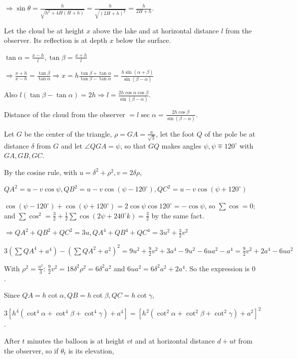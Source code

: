   $\Rightarrow \sin\theta = \frac{h}{\sqrt{h^2 + 4H(H + h)}} = \frac{h}{\sqrt{(2H + h)^2}} = \frac{h}{2H + h}$.
\item Let the cloud be at height $x$ above the lake and at horizontal distance $l$ from the observer. Its
  reflection is at depth $x$ below the surface.

  $\tan\alpha = \frac{x - h}{l}, \tan\beta = \frac{x + h}{l}$

  $\Rightarrow \frac{x + h}{x - h} = \frac{\tan\beta}{\tan\alpha}\Rightarrow x = h\frac{\tan\beta +
  \tan\alpha}{\tan\beta - \tan\alpha} = \frac{h\sin(\alpha + \beta)}{\sin(\beta - \alpha)}$

  Also $l(\tan\beta - \tan\alpha) = 2h\Rightarrow l = \frac{2h\cos\alpha\cos\beta}{\sin(\beta - \alpha)}$.

  Distance of the cloud from the observer $= l\sec\alpha = \frac{2h\cos\beta}{\sin(\beta - \alpha)}$.
\item Let $G$ be the center of the triangle, $\rho = GA = \frac{a}{\sqrt{3}}$, let the foot $Q$ of the pole be
  at distance $\delta$ from $G$ and let $\angle QGA = \psi$, so that $GQ$ makes angles $\psi, \psi\mp120^\circ$
  with $GA, GB, GC$.

  By the cosine rule, with $u = \delta^2 + \rho^2, v = 2\delta\rho$,

  $QA^2 = u - v\cos\psi, QB^2 = u - v\cos(\psi - 120^\circ), QC^2 = u - v\cos(\psi + 120^\circ)$

  $\cos(\psi - 120^\circ) + \cos(\psi + 120^\circ) = 2\cos\psi\cos120^\circ = -\cos\psi$, so $\sum\cos = 0$; and
  $\sum\cos^2 = \frac{3}{2} + \frac{1}{2}\sum\cos(2\psi + 240^\circ k) = \frac{3}{2}$ by the same fact.

  $\Rightarrow QA^2 + QB^2 + QC^2 = 3u, QA^4 + QB^4 + QC^4 = 3u^2 + \frac{3}{2}v^2$

  $3\left(\sum QA^4 + a^4\right) - \left(\sum QA^2 + a^2\right)^2 = 9u^2 + \frac{9}{2}v^2 + 3a^4 - 9u^2 - 6ua^2 -
  a^4 = \frac{9}{2}v^2 + 2a^4 - 6ua^2$

  With $\rho^2 = \frac{a^2}{3}$: $\frac{9}{2}v^2 = 18\delta^2\rho^2 = 6\delta^2a^2$ and $6ua^2 = 6\delta^2a^2 +
  2a^4$. So the expression is $0$.

  Since $QA = h\cot\alpha, QB = h\cot\beta, QC = h\cot\gamma$,

  $3\left[h^4\left(\cot^4\alpha + \cot^4\beta + \cot^4\gamma\right) + a^4\right] = \left[h^2\left(\cot^2\alpha +
  \cot^2\beta + \cot^2\gamma\right) + a^2\right]^2$.
\item After $t$ minutes the balloon is at height $vt$ and at horizontal distance $d + ut$ from the observer, so
  if $\theta_t$ is its elevation,

